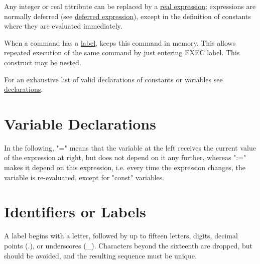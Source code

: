 Any integer or real attribute can be replaced by
a \href{expression.html}{real expression}; expressions are
normally deferred 
(see \hyperref[sec:defer]{deferred expression}), except in the  
definition of constants where they are evaluated immediately.

When a command has a \href{label.html}{label}, \madx keeps this command
in memory. This allows repeated execution of the same command
by just entering EXEC label. This construct may be nested.

For an exhaustive list of valid declarations of constants or variables
see \href{declarations.html}{declarations}.


\section{Variable Declarations}
\label{subsec:var_declarations}

In the following, "=" means that the variable at the left receives the
current value of the expression at right, but does not depend on it any
further, whereas ":=" makes it depend on this expression, i.e. every
time the expression changes, the variable is re-evaluated, except for
"const" variables.  



\section{Identifiers or Labels}
\label{sec:label}
A label begins with a letter, followed by up to fifteen letters, digits,
decimal points (.), or underscores (\_). Characters beyond the sixteenth
are dropped, but should be avoided, and the resulting sequence must be
unique. 

